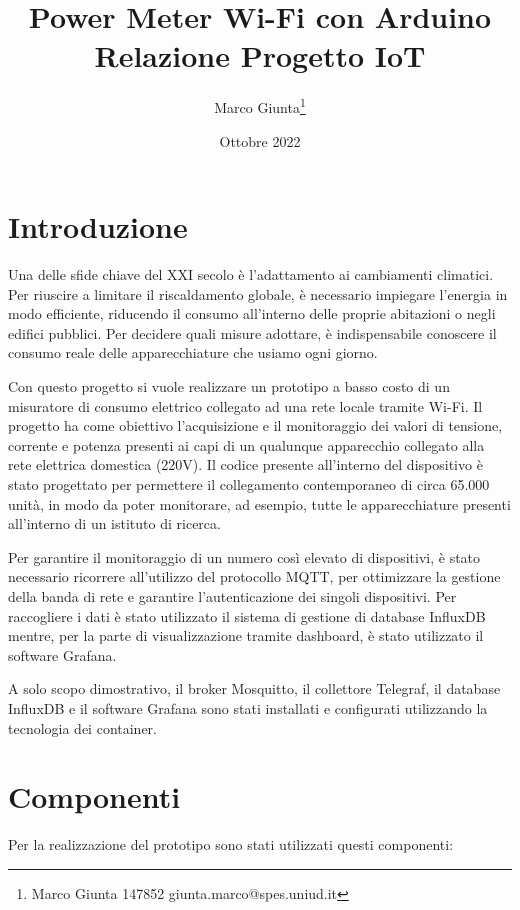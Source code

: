 \documentclass[italian,12pt,a4paper,oneside,final]{report}
\title{\huge Power Meter Wi-Fi con Arduino\\[0.5em]
\large Relazione Progetto IoT}
\date{Ottobre 2022}
\author{
Marco Giunta\thanks{Marco Giunta 147852 giunta.marco@spes.uniud.it}}
\begin{document}
\maketitle

\tableofcontents

\newpage

\section{Introduzione}
Una delle sfide chiave del XXI secolo è l’adattamento ai cambiamenti climatici.
Per riuscire a limitare il riscaldamento globale, è necessario impiegare l’energia in modo efficiente, riducendo il consumo all'interno delle proprie abitazioni o negli edifici pubblici.
Per decidere quali misure adottare, è indispensabile conoscere il consumo reale delle apparecchiature che usiamo ogni giorno.

Con questo progetto si vuole realizzare un prototipo a basso costo di un misuratore di consumo elettrico collegato ad una rete locale tramite Wi-Fi.
Il progetto ha come obiettivo l’acquisizione e il monitoraggio dei valori di tensione, corrente e potenza presenti ai capi di un qualunque apparecchio collegato alla rete elettrica domestica (220V).
Il codice presente all'interno del dispositivo è stato progettato per permettere il collegamento contemporaneo di circa 65.000 unità, in modo da poter monitorare, ad esempio, tutte le apparecchiature presenti all'interno di un istituto di ricerca.

Per garantire il monitoraggio di un numero così elevato di dispositivi, è stato necessario ricorrere all'utilizzo del protocollo MQTT, per ottimizzare la gestione della banda di rete e garantire l'autenticazione dei singoli dispositivi.
Per raccogliere i dati è stato utilizzato il sistema di gestione di database InfluxDB mentre, per la parte di visualizzazione tramite dashboard, è stato utilizzato il software Grafana.

A solo scopo dimostrativo, il broker Mosquitto, il collettore Telegraf, il database InfluxDB e il software Grafana sono stati installati e configurati utilizzando la tecnologia dei container.

\newpage

\section{Componenti}
Per la realizzazione del prototipo sono stati utilizzati questi componenti:
\end{document}
